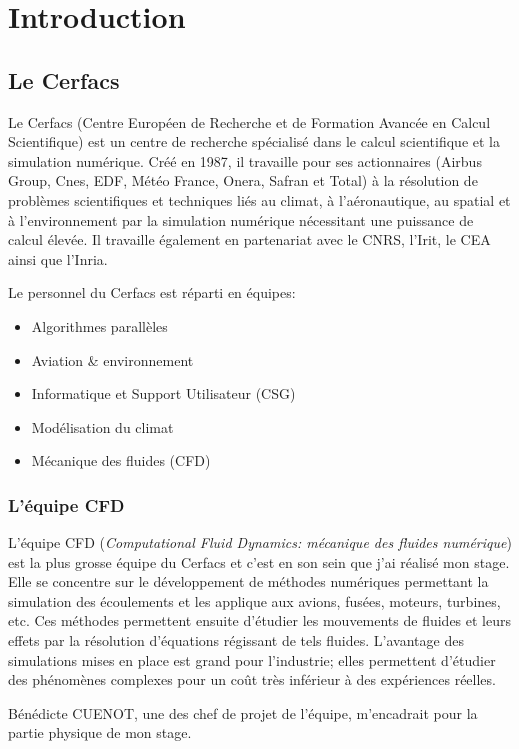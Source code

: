 \section{Introduction}
\subsection{Le Cerfacs}\label{sec:intro}

Le Cerfacs (Centre Européen de Recherche et de Formation Avancée en Calcul Scientifique) est un centre de recherche spécialisé dans le calcul scientifique et la simulation numérique. Créé en 1987, il travaille pour ses actionnaires (Airbus Group, Cnes, EDF, Météo France, Onera, Safran et Total) à la résolution de problèmes scientifiques et techniques liés au climat, à l'aéronautique, au spatial et à l'environnement par la simulation numérique nécessitant une puissance de calcul élevée. Il travaille également en partenariat avec le CNRS, l'Irit, le CEA ainsi que l'Inria.


Le personnel du Cerfacs est réparti en équipes:
\begin{itemize}
\item Algorithmes parallèles
\item Aviation \& environnement
\item Informatique et Support Utilisateur (CSG)
\item Modélisation du climat
\item Mécanique des fluides (CFD)
\end{itemize}

\subsubsection{L'équipe CFD}
L'équipe CFD (\textit{Computational Fluid Dynamics: mécanique des fluides numérique}) est la plus grosse équipe du Cerfacs et c'est en son sein que j'ai réalisé mon stage. Elle se concentre sur le développement de méthodes numériques permettant la simulation des écoulements et les applique aux avions, fusées, moteurs, turbines, etc. Ces méthodes permettent ensuite d'étudier les mouvements de fluides et leurs effets par la résolution d'équations régissant de tels fluides. L'avantage des simulations mises en place est grand pour l'industrie; elles permettent d'étudier des phénomènes complexes pour un coût très inférieur à des expériences réelles.

Bénédicte CUENOT, une des chef de projet de l'équipe, m'encadrait pour la partie physique de mon stage.


